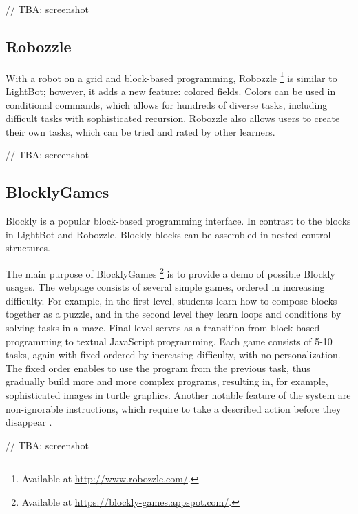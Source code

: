 \documentclass[
    digital,
    color,
    11pt,
    nocover,
    table,  %
    nolof,  %
    nolot,  %
    microtype,
]{fithesis3}
\begin{document}
// TBA: screenshot


\subsection{Robozzle}
\label{sec:robozzle}
With a robot on a grid and block-based programming, Robozzle%
  \footnote{Available at \url{http://www.robozzle.com/}.}
  is similar to LightBot;
however, it adds a new feature: colored fields.
Colors can be used in conditional commands,
  which allows for hundreds of diverse tasks,
  including difficult tasks with sophisticated recursion.
Robozzle also allows users to create their own tasks,
  which can be tried and rated by other learners.

// TBA: screenshot


\subsection{BlocklyGames}
\label{sec:blockly-games}
Blockly is a popular block-based programming interface.
In contrast to the blocks in LightBot and Robozzle,
Blockly blocks can be assembled in nested control structures.

The main purpose of BlocklyGames%
\footnote{Available at \url{https://blockly-games.appspot.com/}.}
is to provide a demo of possible Blockly usages.
The webpage consists of several simple games, ordered in increasing difficulty.
For example, in the first level, students learn how to compose blocks together as a puzzle,
and in the second level they learn loops and conditions by solving tasks in a maze.
Final level serves as a transition from block-based programming to textual JavaScript programming.
Each game consists of 5-10 tasks, again with fixed ordered by increasing difficulty, with no personalization.
The fixed order enables to use the program from the previous task,
thus gradually build more and more complex programs,
resulting in, for example, sophisticated images in turtle graphics.
Another notable feature of the system are non-ignorable instructions,
which require to take a described action before they disappear
\cite{blockly-10-things}.

// TBA: screenshot
\end{document}
